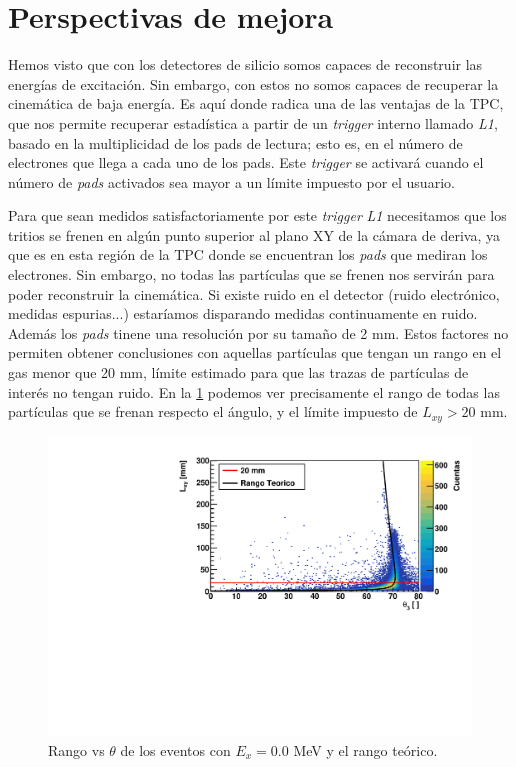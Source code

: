 

\section{Perspectivas de mejora}

Hemos visto que con los detectores de silicio somos capaces de reconstruir las energías de excitación. Sin embargo, con estos no somos capaces de recuperar la cinemática de baja energía. Es aquí donde radica una de las ventajas de la TPC, que nos permite recuperar estadística a partir de un \textit{trigger} interno llamado \textit{L1}, basado en la multiplicidad de los pads de lectura; esto es, en el número de electrones que llega a cada uno de los pads. Este \textit{trigger} se activará cuando el número de \textit{pads} activados sea mayor a un límite impuesto por el usuario.


Para que sean medidos satisfactoriamente por este \textit{trigger} \textit{L1} necesitamos que los tritios se frenen en algún punto superior al plano XY de la cámara de deriva, ya que es en esta región de la TPC donde se encuentran los \textit{pads} que mediran los electrones. Sin embargo, no todas las partículas que  se frenen nos servirán para poder reconstruir la cinemática. Si existe ruido en el detector (ruido electrónico, medidas espurias...) estaríamos disparando medidas continuamente en ruido. Además los \textit{pads} tinene una resolución por su tamaño de 2 mm. Estos factores no permiten obtener conclusiones con aquellas partículas que tengan un rango en el gas menor que 20 mm, límite estimado para que las trazas de partículas de interés no tengan ruido.  En la \cref{Fig:06-RangeTheta} podemos ver precisamente el rango de todas las partículas que se frenan respecto el ángulo, y el límite impuesto de $L_{xy}>20$ mm.  

\begin{figure}[H] \centering
    \includegraphics[width=0.73\linewidth]{Imagenes/Trigger/RangeTheta_Ex0.00_incIdx0.pdf}
    \caption{Rango vs $\theta$ de los eventos con $E_x=0.0$ MeV y el rango teórico.}
    \label{Fig:06-RangeTheta}
\end{figure}

